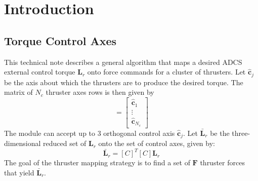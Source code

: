 \documentclass[]{BasiliskReportMemo}
\begin{document}
\section{Introduction}
\subsection{Torque Control Axes}
This technical note describes a general algorithm that maps a desired ADCS external control torque $\bm L_{r}$ onto force commands for a cluster of thrusters.  Let $\hat{\bm c}_{j}$ be the axis about which the thrusters are to produce the desired torque.  The matrix of $N_{c}$ thruster axes rows is then given by
\begin{equation}
	[C]  = \begin{bmatrix}
		\hat{\bm c}_{1} \\ \vdots \\ \hat{\bm c}_{N_{c}}
	\end{bmatrix}
\end{equation}
The module can accept up to 3 orthogonal control axis $\hat{\bm c}_{j}$.  Let $\bar{\bm L}_{r}$ be the three-dimensional reduced set of $\bm L_{r}$ onto the set of control axes, given by:
\begin{equation}
	\bar{\bm L}_{r} = [C]^{T} [C] \bm L_{r}
\end{equation}
The goal of the thruster mapping strategy is to find a set of $\bm F$ thruster forces that yield $\bar{\bm L}_{r}$.  
\end{document}
